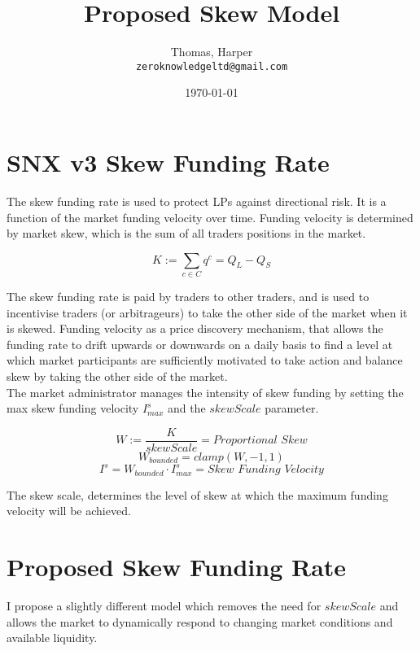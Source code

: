 \documentclass[]{article}
\title{Proposed Skew Model}
\author{
  Thomas, Harper\\
  \texttt{zeroknowledgeltd@gmail.com}
}
\date{\today}
\begin{document}
\maketitle

\section{SNX v3 Skew Funding Rate}

The skew funding rate is used to protect LPs against directional risk. It is a function of the market funding velocity over time. Funding velocity is determined by market skew, which is the sum of all traders positions in the market.

\begin{equation}
K := \sum_{c \in C}{q^c} = Q_L - Q_S
\end{equation}

The skew funding rate is paid by traders to other traders, and is used to incentivise traders (or arbitrageurs) to take the other side of the market when it is skewed. Funding velocity as a price discovery mechanism, that allows the funding rate to drift upwards or downwards on a daily basis to find a level at which market participants are sufficiently motivated to take action and balance skew by taking the other side of the market.\\

The market administrator manages the intensity of skew funding by setting the max skew funding velocity $I^s_{max}$ and the $skewScale$ parameter.

\begin{equation}
W := \frac{K}{skewScale} = \textit{Proportional Skew}
\end{equation}
\begin{equation}
W_{\textit{bounded}} = clamp(W, -1, 1)
\end{equation}
\begin{equation}
I^s = W_{\textit{bounded}}\cdot I^s_{max} = \textit{Skew Funding Velocity}
\end{equation}

The skew scale, determines the level of skew at which the maximum funding velocity will be achieved.

\section{Proposed Skew Funding Rate}

I propose a slightly different model which removes the need for $skewScale$ and allows the market to dynamically respond to changing market conditions and available liquidity.\\
\end{document}
